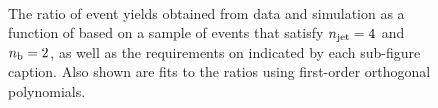 \begin{figure}[h!]
\begin{center}
    \\
    \caption{The ratio of event yields obtained from data and simulation as a function of \mht [GeV] based on a sample of \mj events that satisfy $n_{\text{jet}} = 4$ and $n_{\text{b}} = 2$, as well as the requirements on \scalht indicated by each sub-figure caption. Also shown are fits to the ratios using first-order orthogonal polynomials.}
    \label{fig:mhtval_Mu_eq4j_eq2b}
  \end{center}
\end{figure}

